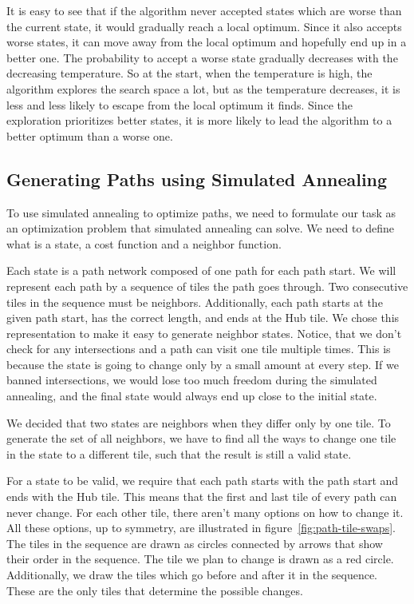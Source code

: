 It is easy to see that if the algorithm never accepted states which are worse than the current state, it would gradually reach a local optimum.
Since it also accepts worse states, it can move away from the local optimum and hopefully end up in a better one.
The probability to accept a worse state gradually decreases with the decreasing temperature.
So at the start, when the temperature is high, the algorithm explores the search space a lot, but as the temperature decreases, it is less and less likely to escape from the local optimum it finds.
Since the exploration prioritizes better states, it is more likely to lead the algorithm to a better optimum than a worse one.

\subsection{Generating Paths using Simulated Annealing}\label{sec:analysis-our-simulated-annealing}

To use simulated annealing to optimize paths, we need to formulate our task as an optimization problem that simulated annealing can solve.
We need to define what is a state, a cost function and a neighbor function.

Each state is a path network composed of one path for each path start.
We will represent each path by a sequence of tiles the path goes through.
Two consecutive tiles in the sequence must be neighbors.
Additionally, each path starts at the given path start, has the correct length, and ends at the Hub tile.
We chose this representation to make it easy to generate neighbor states.
Notice, that we don't check for any intersections and a path can visit one tile multiple times.
This is because the state is going to change only by a small amount at every step.
If we banned intersections, we would lose too much freedom during the simulated annealing, and the final state would always end up close to the initial state.

We decided that two states are neighbors when they differ only by one tile.
To generate the set of all neighbors, we have to find all the ways to change one tile in the state to a different tile, such that the result is still a valid state.

For a state to be valid, we require that each path starts with the path start and ends with the Hub tile.
This means that the first and last tile of every path can never change.
For each other tile, there aren't many options on how to change it.
All these options, up to symmetry, are illustrated in figure~\ref{fig:path-tile-swaps}.
The tiles in the sequence are drawn as circles connected by arrows that show their order in the sequence.
The tile we plan to change is drawn as a red circle.
Additionally, we draw the tiles which go before and after it in the sequence.
These are the only tiles that determine the possible changes.

